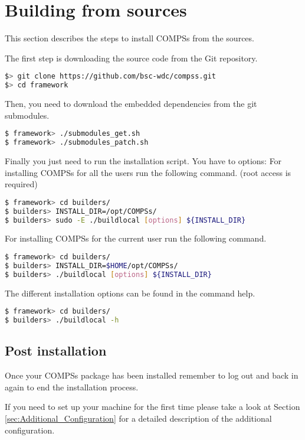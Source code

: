 \section{Building from sources}
\label{sec:Sources}
This section describes the steps to install COMPSs from the sources.

The first step is downloading the source code from the Git repository.
\begin{lstlisting}[language=bash]
$> git clone https://github.com/bsc-wdc/compss.git
$> cd framework
\end{lstlisting}

Then, you need to download the embedded dependencies from the git submodules.
\begin{lstlisting}[language=bash]
$ framework> ./submodules_get.sh
$ framework> ./submodules_patch.sh
\end{lstlisting}

Finally you just need to run the installation script. You have to options: 
For installing COMPSs for all the users run the following command. (root access is required)
\begin{lstlisting}[language=bash]
$ framework> cd builders/
$ builders> INSTALL_DIR=/opt/COMPSs/
$ builders> sudo -E ./buildlocal [options] ${INSTALL_DIR}
\end{lstlisting}
For installing COMPSs for the current user run the following command.
\begin{lstlisting}[language=bash]
$ framework> cd builders/
$ builders> INSTALL_DIR=$HOME/opt/COMPSs/
$ builders> ./buildlocal [options] ${INSTALL_DIR}
\end{lstlisting}

The different installation options can be found in the command help.
\begin{lstlisting}[language=bash]
$ framework> cd builders/
$ builders> ./buildlocal -h
\end{lstlisting}

\subsection{Post installation}
Once your COMPSs package has been installed remember to log out and back in again to end the installation process.

If you need to set up your machine for the first time please take a look at Section \ref{sec:Additional_Configuration} for a 
detailed description of the additional configuration. 